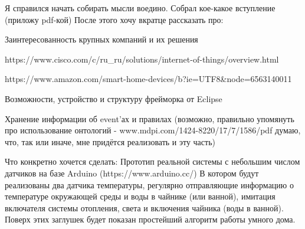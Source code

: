 Я справился начать собирать мысли воедино.
Собрал кое-какое вступление (приложу pdf-кой)
После этого хочу вкратце рассказать про:
\begin{list}{}{}
    \item Заинтересованность крупных компаний и их решения
        \begin{list}{}{}
            \item https://www.cisco.com/c/ru\_ru/solutions/internet-of-things/overview.html
            \item https://www.amazon.com/smart-home-devices/b?ie=UTF8\&node=6563140011
        \end{list}
    \item Возможности, устройство и структуру фрейморка от Eclipse
    \item Хранение информации об event'ах и правилах
    (возможно, правильно упомянуть про использование онтологий - www.mdpi.com/1424-8220/17/7/1586/pdf 
    думаю, что, так или иначе, мне придётся реализовать и эту часть)
    \item Что конкретно хочется сделать:
    Прототип реальной системы с небольшим числом датчиков на базе Arduino
    (https://www.arduino.cc/)
    В котором будут реализованы два датчика температуры, регулярно отправляющие информацию о температуре окружающей среды и воды в чайнике (или ванной),
    имитация включателя системы отопления, света и включения чайника (воды в ванной). Поверх этих заглушек будет показан простейший алгоритм работы умного дома.
\end{list}
